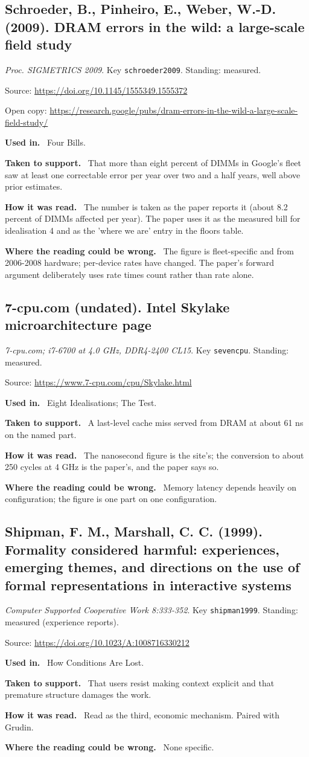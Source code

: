 \documentclass[11pt,oneside]{article}
\newcommand{\field}[1]{\par\noindent\textbf{\color{accent}#1.}\ }
\begin{document}
\hypertarget{src:schroeder2009}{}
\subsection*{Schroeder, B., Pinheiro, E., Weber, W.-D. (2009). DRAM errors in the wild: a large-scale field study}
\noindent\small\emph{Proc. SIGMETRICS 2009}. Key \texttt{schroeder2009}. Standing: measured.
\par\noindent\small Source: \url{https://doi.org/10.1145/1555349.1555372}
\par\noindent\small Open copy: \url{https://research.google/pubs/dram-errors-in-the-wild-a-large-scale-field-study/}
\normalsize
\field{Used in} Four Bills.
\field{Taken to support} That more than eight percent of DIMMs in Google's fleet saw at least one correctable error per year over two and a half years, well above prior estimates.
\field{How it was read} The number is taken as the paper reports it (about 8.2 percent of DIMMs affected per year). The paper uses it as the measured bill for idealisation 4 and as the 'where we are' entry in the floors table.
\field{Where the reading could be wrong} The figure is fleet-specific and from 2006-2008 hardware; per-device rates have changed. The paper's forward argument deliberately uses rate times count rather than rate alone.

\hypertarget{src:sevencpu}{}
\subsection*{7-cpu.com (undated). Intel Skylake microarchitecture page}
\noindent\small\emph{7-cpu.com; i7-6700 at 4.0 GHz, DDR4-2400 CL15}. Key \texttt{sevencpu}. Standing: measured.
\par\noindent\small Source: \url{https://www.7-cpu.com/cpu/Skylake.html}
\normalsize
\field{Used in} Eight Idealisations; The Test.
\field{Taken to support} A last-level cache miss served from DRAM at about 61 ns on the named part.
\field{How it was read} The nanosecond figure is the site's; the conversion to about 250 cycles at 4 GHz is the paper's, and the paper says so.
\field{Where the reading could be wrong} Memory latency depends heavily on configuration; the figure is one part on one configuration.

\hypertarget{src:shipman1999}{}
\subsection*{Shipman, F. M., Marshall, C. C. (1999). Formality considered harmful: experiences, emerging themes, and directions on the use of formal representations in interactive systems}
\noindent\small\emph{Computer Supported Cooperative Work 8:333-352}. Key \texttt{shipman1999}. Standing: measured (experience reports).
\par\noindent\small Source: \url{https://doi.org/10.1023/A:1008716330212}
\normalsize
\field{Used in} How Conditions Are Lost.
\field{Taken to support} That users resist making context explicit and that premature structure damages the work.
\field{How it was read} Read as the third, economic mechanism. Paired with Grudin.
\field{Where the reading could be wrong} None specific.
\end{document}
